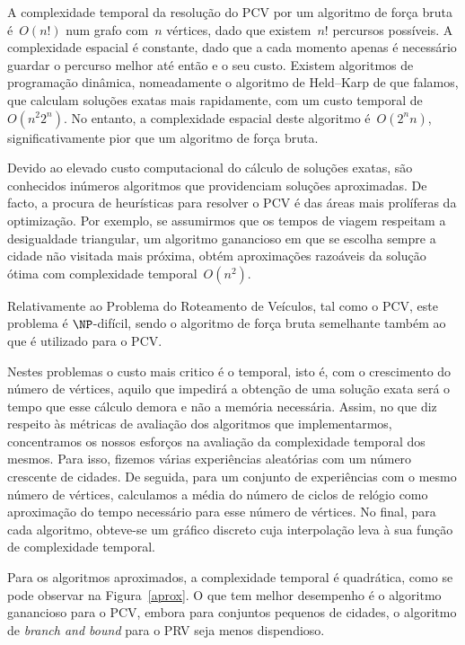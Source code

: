 \documentclass[12pt,a4paper,reqno]{report}
\numberwithin{equation}{section}
\begin{document}
A complexidade temporal da resolução do PCV por um algoritmo de força bruta é~$O(n!)$ num grafo com~$n$ vértices, dado que existem~$n!$ percursos possíveis. A complexidade espacial é constante, dado que a cada momento apenas é necessário guardar o percurso melhor até então e o seu custo. Existem algoritmos de programação dinâmica, nomeadamente o algoritmo de Held–Karp de que falamos, que calculam soluções exatas mais rapidamente, com um custo temporal de~$O(n^2 2^n)$. No entanto, a complexidade espacial deste algoritmo é~$O(2^n n)$, significativamente pior que um algoritmo de força bruta.

Devido ao elevado custo computacional do cálculo de soluções exatas, são conhecidos inúmeros algoritmos que providenciam soluções aproximadas. De facto, a procura de heurísticas para resolver o PCV é das áreas mais prolíferas da optimização. Por exemplo, se assumirmos que os tempos de viagem respeitam a desigualdade triangular, um algoritmo ganancioso em que se escolha sempre a cidade não visitada mais próxima, obtém aproximações razoáveis da solução ótima com complexidade temporal~$O(n^2)$.

Relativamente ao Problema do Roteamento de Veículos, tal como o PCV, este problema é $\NP$-difícil, sendo o algoritmo de força bruta semelhante também ao que é utilizado para o PCV.

Nestes problemas o custo mais critico é o temporal, isto é, com o crescimento do número de vértices, aquilo que impedirá a obtenção de uma solução exata será o tempo que esse cálculo demora e não a memória necessária. Assim, no que diz respeito às métricas de avaliação dos algoritmos que implementarmos, concentramos os nossos esforços na avaliação da complexidade temporal dos mesmos. Para isso, fizemos várias experiências aleatórias com um número crescente de cidades. De seguida, para um conjunto de experiências com o mesmo número de vértices, calculamos a média do número de ciclos de relógio como aproximação do tempo necessário para esse número de vértices. No final, para cada algoritmo, obteve-se um gráfico discreto cuja interpolação leva à sua função de complexidade temporal.

Para os algoritmos aproximados, a complexidade temporal é quadrática, como se pode observar na Figura~\ref{aprox}. O que tem melhor desempenho é o algoritmo ganancioso para o PCV, embora para conjuntos pequenos de cidades, o algoritmo de \emph{branch and bound} para o PRV seja menos dispendioso.
\end{document}
